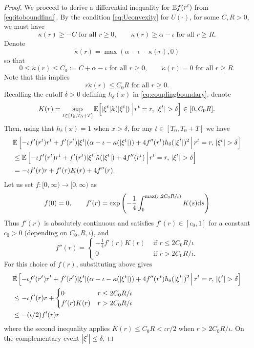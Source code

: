 \begin{proof}
We proceed to derive a differential inequality for $\mathbb{E} f(r^t)$ from
\eqref{eq:itoboundfinal}.
By the condition \eqref{eq:Uconvexity} for $U(\cdot)$,
for some $C,R>0$, we must have
\[\kappa(r) \geq -C \text{ for all }
r \geq 0, \qquad \kappa(r) \geq \alpha-\iota \text{ for all } r \geq R.\]
Denote
\[\tilde \kappa(r)=\max(\alpha-\iota-\kappa(r),0)\]
so that
\[0 \leq \tilde \kappa(r) \leq C_0:=C+\alpha-\iota \text{ for all } r \geq 0,
\qquad \tilde \kappa(r)=0 \text{ for all } r \geq R.\]
Note that this implies
\[r\tilde \kappa(r) \leq C_0R \text{ for all } r \geq 0.\]
Recalling the cutoff $\delta>0$ defining $h_\delta(x)$ in
\eqref{eq:couplingboundary}, denote
\[K(r)=\sup_{t \in [T_0,T_0+T]} \E\Big[|\xi^t|\tilde \kappa(|\xi^t|)\,\Big|\,
r^t=r,\,|\xi^t|>\delta\Big] \in [0,C_0R].\]
Then, using that $h_\delta(x)=1$ when $x>\delta$, for any $t \in [T_0,T_0+T]$ we have
\begin{align*}
&\E\left[-\iota f'(r^t)r^t
+f'(r^t)|\xi^t|(\alpha-\iota-\kappa(|\xi^t|))
+4f''(r^t)h_\delta(|\xi^t|)^2 \,\Big|\,r^t=r,\,|\xi^t|>\delta \right]\\
&\leq \E\left[-\iota f'(r^t)r^t
+f'(r^t)|\xi^t|\tilde \kappa(|\xi^t|)
+4f''(r^t) \,\Big|\,r^t=r,\,|\xi^t|>\delta \right]\\
&={-}\iota f'(r)r+f'(r)K(r)+4f''(r).
\end{align*}
Let us set $f:[0,\infty) \to [0,\infty)$ as
\[f(0)=0,
\qquad f'(r)=\exp\left(-\frac{1}{4}\int_0^{\max(r,2C_0R/\iota)}
K(s)\mathrm{d} s\right)\]
Thus $f'(r)$ is absolutely continuous and satisfies $f'(r) \in [c_0,1]$ for a
constant $c_0>0$ (depending on $C_0,R,\iota$), and
\[f''(r)=\begin{cases} {-}\frac{1}{4}f'(r)K(r) & \text{ if } r \leq
2C_0R/\iota \\
0 & \text{ if } r>2C_0R/\iota. \end{cases}\]
For this choice of $f(r)$, substituting above gives
\begin{align*}
&\E\left[-\iota f'(r^t)r^t
+f'(r^t)|\xi^t|(\alpha-\iota-\kappa(|\xi^t|))
+4f''(r^t)h_\delta(|\xi^t|)^2 \,\Big|\,r^t=r,\,|\xi^t|>\delta \right]\\
&\leq {-}\iota f'(r)r
+\begin{cases} 0 & r \leq 2C_0R/\iota \\
f'(r)K(r) & r>2C_0R/\iota \end{cases}\\
&\leq {-}(\iota/2)f'(r)r
\end{align*}
where the second inequality applies $K(r) \leq C_0R<\iota
r/2$ when $r>2C_0R/\iota$. On the complementary event $|\xi^t| \leq \delta$,

\end{proof}
